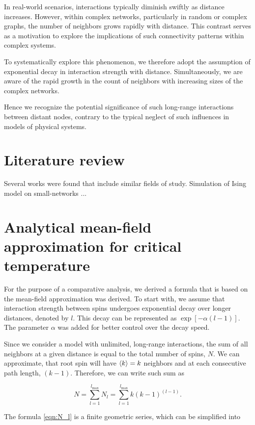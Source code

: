 \documentclass[11pt,a4paper]{article}
\begin{document}
In real-world scenarios, interactions typically diminish swiftly as distance increases. However, within complex networks, particularly in random or complex graphs, the number of neighbors grows rapidly with distance. This contrast serves as a motivation to explore the implications of such connectivity patterns within complex systems.

To systematically explore this phenomenon, we therefore adopt the assumption of exponential decay in interaction strength with distance. Simultaneously, we are aware of the rapid growth in the count of neighbors with increasing sizes of the complex networks.

Hence we recognize the potential significance of such long-range interactions between distant nodes, contrary to the typical neglect of such influences in models of physical systems.


\section{Literature review}

Several works were found that include similar fields of study. 
Simulation of Ising model on small-networks ...


\section{Analytical mean-field approximation for critical temperature}

For the purpose of a comparative analysis, we derived a formula that is based on the mean-field approximation was derived. To start with, we assume that interaction strength between spins undergoes exponential decay over longer distances, denoted by $l$. This decay can be represented as $\exp[-\alpha (l-1)]$. The parameter $\alpha$ was added for better control over the decay speed.

Since we consider a model with unlimited, long-range interactions, the sum of all neighbors at a given distance is equal to the total number of spins, $N$. We can approximate, that root spin will have $\braket{k}=k$ neighbors and at each consecutive path length, $(k-1)$. Therefore, we can write such sum as

\begin{equation}\label{eqn:N_l}
    N = \sum_{l=1}^{l_{\max}} N_l = \sum_{l=1}^{l_{\max}} k (k-1)^{(l-1)}.
\end{equation}

The formula \eqref{eqn:N_l} is a finite geometric series, which can be simplified into
\end{document}
